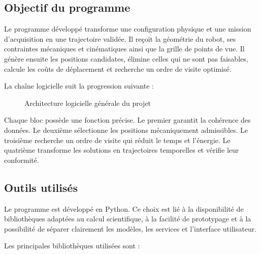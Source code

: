\subsection{Objectif du programme}

Le programme développé transforme une configuration physique et une mission d'acquisition en une trajectoire validée. Il reçoit la géométrie du robot, ses contraintes mécaniques et cinématiques ainsi que la grille de points de vue. Il génère ensuite les positions candidates, élimine celles qui ne sont pas faisables, calcule les coûts de déplacement et recherche un ordre de visite optimisé.

La chaîne logicielle suit la progression suivante :

\begin{figure}[H]
\centering
{}
\caption{Architecture logicielle générale du projet}
\label{fig:architecture_logicielle}
\end{figure}

Chaque bloc possède une fonction précise. Le premier garantit la cohérence des données. Le deuxième sélectionne les positions mécaniquement admissibles. Le troisième recherche un ordre de visite qui réduit le temps et l'énergie. Le quatrième transforme les solutions en trajectoires temporelles et vérifie leur conformité.

\subsection{Outils utilisés}

Le programme est développé en Python. Ce choix est lié à la disponibilité de bibliothèques adaptées au calcul scientifique, à la facilité de prototypage et à la possibilité de séparer clairement les modèles, les services et l'interface utilisateur.

Les principales bibliothèques utilisées sont :

